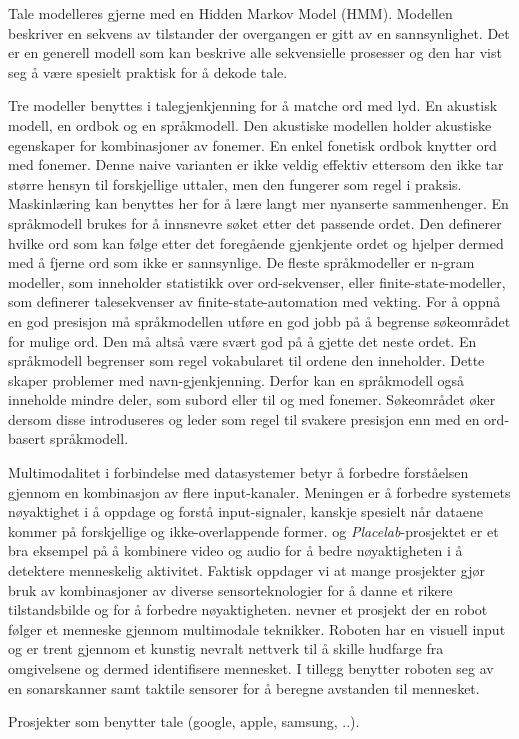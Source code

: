 {Tale modelleres gjerne med en Hidden Markov Model (HMM). Modellen beskriver en sekvens av tilstander der overgangen er gitt av en sannsynlighet. Det er en generell modell som kan beskrive alle sekvensielle prosesser og den har vist seg å være spesielt praktisk for å dekode tale.

Tre modeller benyttes i talegjenkjenning for å matche ord med lyd. En akustisk modell, en ordbok og en språkmodell. Den akustiske modellen holder akustiske egenskaper for kombinasjoner av fonemer. En enkel fonetisk ordbok knytter ord med fonemer. Denne naive varianten er ikke veldig effektiv ettersom den ikke tar større hensyn til forskjellige uttaler, men den fungerer som regel i praksis. Maskinlæring kan benyttes her for å lære langt mer nyanserte sammenhenger. En språkmodell brukes for å innsnevre søket etter det passende ordet. Den definerer hvilke ord som kan følge etter det foregående gjenkjente ordet og hjelper dermed med å fjerne ord som ikke er sannsynlige. De fleste språkmodeller er n-gram modeller, som inneholder statistikk over ord-sekvenser, eller finite-state-modeller, som definerer talesekvenser av finite-state-automation med vekting. For å oppnå en god presisjon må språkmodellen utføre en god jobb på å begrense søkeområdet for mulige ord. Den må altså være svært god på å gjette det neste ordet. En språkmodell begrenser som regel vokabularet til ordene den inneholder. Dette skaper problemer med navn-gjenkjenning. Derfor kan en språkmodell også inneholde mindre deler, som subord eller til og med fonemer. Søkeområdet øker dersom disse introduseres og leder som regel til svakere presisjon enn med en ord-basert språkmodell.  

Multimodalitet i forbindelse med datasystemer betyr å forbedre forståelsen gjennom en kombinasjon av flere input-kanaler. Meningen er å forbedre systemets nøyaktighet i å oppdage og forstå input-signaler, kanskje spesielt når dataene kommer på forskjellige og ikke-overlappende former. \citet{placelab05} og \emph{Placelab}-prosjektet er et bra eksempel på å kombinere video og audio for å bedre nøyaktigheten i å detektere menneskelig aktivitet. Faktisk oppdager vi at mange prosjekter gjør bruk av kombinasjoner av diverse sensorteknologier for å danne et rikere tilstandsbilde og for å forbedre nøyaktigheten. \citet{desilva12} nevner et prosjekt der en robot følger et menneske gjennom multimodale teknikker. Roboten har en visuell input og er trent gjennom et kunstig nevralt nettverk til å skille hudfarge fra omgivelsene og dermed identifisere mennesket. I tillegg benytter roboten seg av en sonarskanner samt taktile sensorer for å beregne avstanden til mennesket.

Prosjekter som benytter tale (google, apple, samsung, ..).
}

